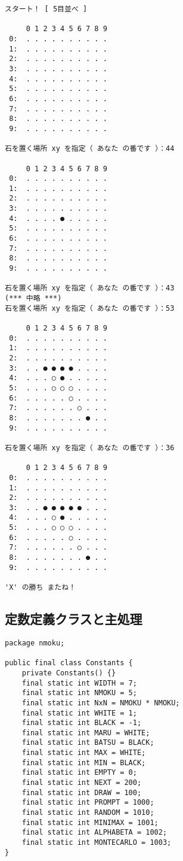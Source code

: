 \documentclass[uplatex,a4paper,11pt,oneside,openany]{jsbook}
\begin{document}
\begin{spacing}{0.6}
  \begin{verbatim}
スタート！ [ 5目並べ ]

     0 1 2 3 4 5 6 7 8 9
 0:  . . . . . . . . . .
 1:  . . . . . . . . . .
 2:  . . . . . . . . . .
 3:  . . . . . . . . . .
 4:  . . . . . . . . . .
 5:  . . . . . . . . . .
 6:  . . . . . . . . . .
 7:  . . . . . . . . . .
 8:  . . . . . . . . . .
 9:  . . . . . . . . . .

石を置く場所 xy を指定（ あなた の番です ）：44

     0 1 2 3 4 5 6 7 8 9
 0:  . . . . . . . . . .
 1:  . . . . . . . . . .
 2:  . . . . . . . . . .
 3:  . . . . . . . . . .
 4:  . . . . ● . . . . .
 5:  . . . . . . . . . .
 6:  . . . . . . . . . .
 7:  . . . . . . . . . .
 8:  . . . . . . . . . .
 9:  . . . . . . . . . .

石を置く場所 xy を指定（ あなた の番です ）：43
(*** 中略 ***)
石を置く場所 xy を指定（ あなた の番です ）：53

     0 1 2 3 4 5 6 7 8 9
 0:  . . . . . . . . . .
 1:  . . . . . . . . . .
 2:  . . . . . . . . . .
 3:  . . ● ● ● ● . . . .
 4:  . . . ○ ● . . . . .
 5:  . . . ○ ○ ○ . . . .
 6:  . . . . . ○ . . . .
 7:  . . . . . . ○ . . .
 8:  . . . . . . . ● . .
 9:  . . . . . . . . . .

石を置く場所 xy を指定（ あなた の番です ）：36

     0 1 2 3 4 5 6 7 8 9
 0:  . . . . . . . . . .
 1:  . . . . . . . . . .
 2:  . . . . . . . . . .
 3:  . . ● ● ● ● ● . . .
 4:  . . . ○ ● . . . . .
 5:  . . . ○ ○ ○ . . . .
 6:  . . . . . ○ . . . .
 7:  . . . . . . ○ . . .
 8:  . . . . . . . ● . .
 9:  . . . . . . . . . .

'X' の勝ち	またね！
\end{verbatim}
\end{spacing}


\subsection{定数定義クラスと主処理}

\begin{lstlisting}[caption=定数定義クラス：N目並べ,label=prog22]
package nmoku;

public final class Constants {
    private Constants() {}
    final static int WIDTH = 7;
    final static int NMOKU = 5;
    final static int NxN = NMOKU * NMOKU;
    final static int WHITE = 1;
    final static int BLACK = -1;
    final static int MARU = WHITE;
    final static int BATSU = BLACK;
    final static int MAX = WHITE;
    final static int MIN = BLACK;
    final static int EMPTY = 0;
    final static int NEXT = 200;
    final static int DRAW = 100;
    final static int PROMPT = 1000;
    final static int RANDOM = 1010;
    final static int MINIMAX = 1001;
    final static int ALPHABETA = 1002;
    final static int MONTECARLO = 1003;
}
\end{lstlisting}
\end{document}
